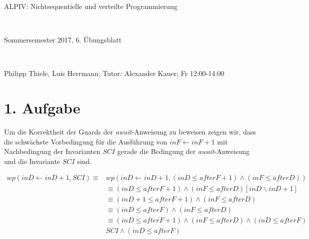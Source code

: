 \documentclass[numbers=noendperiod]{scrartcl}
\begin{document}
	
	
\hrulefill
\begin{center}
	\bfseries %
	\sffamily %
	\begin{huge}
		ALPIV: Nichtsequentielle und verteilte Programmierung
	\end{huge}\\
	\begin{Large}
		Sommersemester 2017, 6. Übungsblatt
	\end{Large}\\
	\begin{small}
		Philipp Thiele, Luis Herrmann; Tutor: Alexander Kauer; Fr 12:00-14:00
	\end{small}
	
	\vspace{-10pt}
\end{center}
\hrulefill

\newcommand{\inputmintedframed}[2]{
	\begin{mdframed}[linecolor=bg,backgroundcolor=bg]
		\inputminted[mathescape,breaklines,linenos,numbersep=5pt,tabsize=3]{#1}{#2}
\end{mdframed}}

\section*{1. Aufgabe}

Um die Korrektheit der Guards der \textit{await}-Anweisung zu beweisen zeigen wir, dass die schwächste Vorbedingung für die Ausführung von $inF \gets inF +1$ mit Nachbedingung der Invarianten $SCI$ gerade die Bedingung der \textit{await}-Anweisung und die Invariante $SCI$ sind.

\begin{align}
	wp(inD \gets inD +1, SCI) \equiv & wp(inD \gets inD + 1, (inD \le afterF + 1) \land (inF \le afterD))\\
	&\equiv (inD \le afterF + 1) \land (inF \le afterD)[inD \backslash inD +1]\\
	&\equiv (inD +1 \le after F +1) \land (inF \le afterD)\\
	&\equiv (inD \le afterF) \land (inF \le afterD)\\
	&\equiv (inD \le afterF + 1) \land (inF \le afterD) \land (inD \le afterF)\\
	& SCI \land (inD \le afterF)
\end{align}
\end{document}
